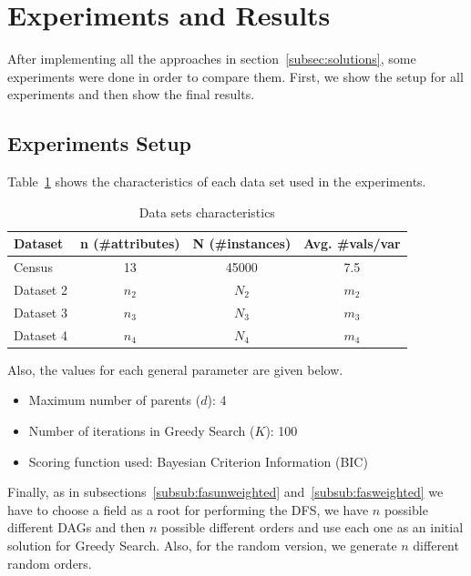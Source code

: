 \section{Experiments and Results}
\label{sec:experiments}

After implementing all the approaches in section~\ref{subsec:solutions}, some experiments were done in order to compare them. First, we show the setup for all experiments and then show the final results.

\subsection{Experiments Setup}
\label{subsec:configuration}
	Table~\ref{tab:datasets} shows the characteristics of each data set used in the experiments.
	\begin{table}[ h ]
		\centering
		\begin{tabular}{ | l | c | c | c | }
			\hline
			Dataset & n (\#attributes) & N (\#instances) & Avg. \#vals/var\\ \hline
			Census & 13 & 45000 & 7.5\\ \hline
			Dataset 2 & $n_2$ & $N_2$ & $m_2$ \\ \hline
			Dataset 3 & $n_3$ & $N_3$ & $m_3$\\ \hline
			Dataset 4 & $n_4$ & $N_4$ & $m_4$\\ \hline
		\end{tabular}
		\caption{Data sets characteristics}
		\label{tab:datasets}
	\end{table}
	Also, the values for each general parameter are given below.
	\begin{itemize}
		\item Maximum number of parents ($d$): 4
		\item Number of iterations in Greedy Search ($K$): 100
		\item Scoring function used: Bayesian Criterion Information (BIC)
	\end{itemize}
	Finally, as in subsections~\ref{subsub:fasunweighted} and~\ref{subsub:fasweighted} we have to choose a field as a root for performing the DFS, we have $n$ possible different DAGs and then $n$ possible different orders and use each one as an initial solution for Greedy Search. Also, for the random version, we generate $n$ different random orders.

